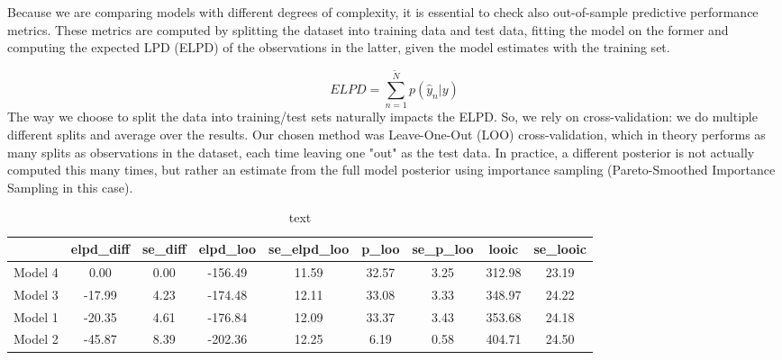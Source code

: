 \documentclass[12pt]{article}
\begin{document}
Because we are comparing models with different degrees of complexity, it is essential to check also out-of-sample predictive performance metrics. These metrics are computed by splitting the dataset into training data and test data, fitting the model on the former and computing the expected LPD (ELPD) of the observations in the latter, given the model estimates with the training set. 

\begin{equation}
	ELPD = \sum_{n= 1}^{\tilde{N}} p(\hat{y}_n | y) 
\end{equation}
The way we choose to split the data into training/test sets naturally impacts the ELPD. So, we rely on cross-validation: we do multiple different splits and average over the results. Our chosen method was Leave-One-Out (LOO) cross-validation, which in theory performs as many splits as observations in the dataset, each time leaving one "out" as the test data. In practice, a different posterior is not actually computed this many times, but rather an estimate from the full model posterior using importance sampling (Pareto-Smoothed Importance Sampling in this case).

\begin{table}[ht]
	\centering
	\begin{tabular}{rcccccccc}
		\hline
		& elpd\_diff & se\_diff & elpd\_loo & se\_elpd\_loo & p\_loo & se\_p\_loo & looic & se\_looic \\ 
		\hline
		Model 4 & 0.00 & 0.00 & -156.49 & 11.59 & 32.57 & 3.25 & 312.98 & 23.19 \\ 
		Model 3 & -17.99 & 4.23 & -174.48 & 12.11 & 33.08 & 3.33 & 348.97 & 24.22 \\ 
		Model 1 & -20.35 & 4.61 & -176.84 & 12.09 & 33.37 & 3.43 & 353.68 & 24.18 \\ 
		Model 2 & -45.87 & 8.39 & -202.36 & 12.25 & 6.19 & 0.58 & 404.71 & 24.50 \\ 
		\hline
	\end{tabular}
	\caption{text}
	\label{tab:loo}
\end{table}
\end{document}
